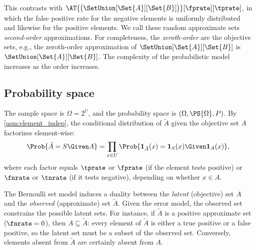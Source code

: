 This contrasts with $\AT{\left(\SetUnion[\Set{A}][\Set{B}]\right)}[\fprate][\tprate]$, in which the false positive rate for the negative elements is uniformly distributed and likewise for the positive elements.
We call these random approximate sets \emph{second-order} approximations.
For completeness, the \emph{zeroth-order} are the objective sets, e.g., the zeroth-order approximation of $\SetUnion[\Set{A}][\Set{B}]$ is $\SetUnion[\Set{A}][\Set{B}]$.
The complexity of the probabilistic model increases as the order increases.

\subsection{Probability space}
\label{sec:prob_model}
The sample space is $\Omega = 2^U$, and the probability space is $(\Omega, \PS{\Omega}, P)$.
By \cref{asm:element_indep}, the conditional distribution of $\tilde{A}$ given the objective set $A$ factorizes element-wise:
\begin{equation}
    \Prob{\tilde{A} = S \Given A} = \prod_{x \in U} \Prob{\mathbf{1}_{\tilde{A}}(x) = \mathbf{1}_S(x) \Given \mathbf{1}_A(x)},
\end{equation}
where each factor equals $\tprate$ or $\fprate$ (if the element tests positive) or $\fnrate$ or $\tnrate$ (if it tests negative), depending on whether $x \in A$.

\begin{remark}
\label{rem:latent_observed}
The Bernoulli set model induces a duality between the \emph{latent} (objective) set $A$
and the \emph{observed} (approximate) set $\tilde{A}$.
Given the error model, the observed set constrains the possible latent sets.
For instance, if $\tilde{A}$ is a positive approximate set ($\fnrate = 0$),
then $A \subseteq \tilde{A}$: every element of $\tilde{A}$ is either a true positive
or a false positive, so the latent set must be a subset of the observed set.
Conversely, elements absent from $\tilde{A}$ are certainly absent from $A$.
\end{remark}


